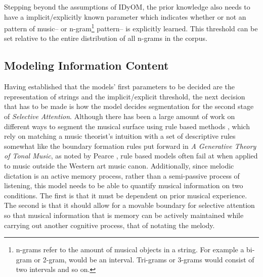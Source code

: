 \documentclass[]{book}
\let\rmarkdownfootnote\footnote%
\def\footnote{\protect\rmarkdownfootnote}
\begin{document}
Stepping beyond the assumptions of IDyOM, the prior knowledge also needs to have a implicit/explicitly known parameter which indicates whether or not an pattern of music-- or n-gram\footnote{n-grams refer to the amount of musical objects in a string. For example a bi-gram or 2-gram, would be an interval. Tri-grams or 3-grams would consist of two intervals and so on.} pattern-- is explicitly learned.
This threshold can be set relative to the entire distribution of all n-grams in the corpus.

\hypertarget{modeling-information-content}{%
\subsection{Modeling Information Content}\label{modeling-information-content}}

Having established that the models' first parameters to be decided are the representation of strings and the implicit/explicit threshold, the next decision that has to be made is how the model decides segmentation for the second stage of \emph{Selective Attention}.
Although there has been a large amount of work on different ways to segment the musical surface using rule based methods \citep{lerdahlGenerativeTheoryTonal1986, margulisModelMelodicExpectation2005, narmourAnalysisCognitionBasic1990, narmourAnalysisCognitionMelodic1992}, which rely on matching a music theorist's intuition with a set of descriptive rules somewhat like the boundary formation rules put forward in \emph{A Generative Theory of Tonal Music}, as noted by Pearce \citep{pearceStatisticalLearningProbabilistic2018a}, rule based models often fail at when applied to music outside the Western art music canon.
Additionally, since melodic dictation is an active memory process, rather than a semi-passive process of listening, this model needs to be able to quantify musical information on two conditions.
The first is that it must be dependent on prior musical experience.
The second is that it should allow for a movable boundary for selective attention so that musical information that is memory can be actively maintained while carrying out another cognitive process, that of notating the melody.
\end{document}
